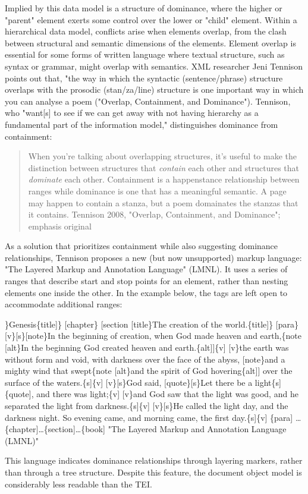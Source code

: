 \documentclass[11pt]{article}
\begin{document}
Implied by this data model is a structure of dominance, where the
higher or "parent" element exerts some control over the lower or
"child" element. Within a hierarchical data model, conflicts arise
when elements overlap, from the clash between structural and semantic
dimensions of the elements. Element overlap is essential for some
forms of written language where textual structure, such as syntax or
grammar, might overlap with semantics. XML researcher Jeni Tennison
points out that, "the way in which the syntactic (sentence/phrase)
structure overlaps with the prosodic (stan/za/line) structure is one
important way in which you can analyse a poem ("Overlap, Containment,
and Dominance"). Tennison, who "want[s] to see if we can get away with
not having hierarchy as a fundamental part of the information model,"
distinguishes dominance from containment:
\begin{quote}
When you’re talking about overlapping structures, it's useful to make
the distinction between structures that \emph{contain} each other and
structures that \emph{dominate} each other. Containment is a happenstance
relationship between ranges while dominance is one that has a
meaningful semantic. A page may happen to contain a stanza, but a poem
domainates the stanzas that it contains. Tennison 2008, "Overlap,
Containment, and Dominance"; emphasis original
\end{quote}
As a solution that prioritizes containment while also suggesting
dominance relationships, Tennison proposes a new (but now unsupported)
markup language: "The Layered Markup and Annotation Language"
(LMNL). It uses a series of ranges that describe start and stop points
for an element, rather than nesting elements one inside the other. In
the example below, the tags are left open to accommodate additional
ranges:
\begin{SOURCE}
[book [title [lang\}en\{lang]\}Genesis\{title]\}
[chapter\}
[section [title\}The creation of the world.\{title]\}
[para\}
[v\}[s\}[note\}In the beginning of creation, when God made heaven and
earth,\{note [alt\}In the beginning God created heaven and
earth.\{alt]]\{v] [v\}the earth was without form and void, with darkness
over the face of the abyss, [note\}and a mighty wind that swept\{note [alt\}and
the spirit of God hovering\{alt]] over the surface of the waters.\{s]\{v]
[v\}[s\}God said, [quote\}[s\}Let there be a light\{s]\{quote], and there
was light;\{v] [v\}and God saw that the light was good, and he separated
the light from darkness.\{s]\{v] [v\}[s\}He called the light day, and the
darkness night. So evening came, and morning came, the first
day.\{s]\{v]
\{para]
\ldots{}\{chapter]\ldots{}\{section]\ldots{}\{book] "The Layered Markup and Annotation
Language (LMNL)" 
\end{SOURCE}
This language indicates dominance relationships through layering
markers, rather than through a tree structure. Despite this feature,
the document object model is considerably less readable than the TEI.
\end{document}
